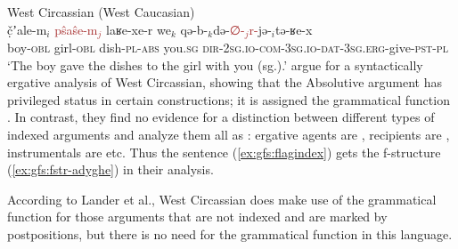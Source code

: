 \documentclass[output=paper]{../langscibook}
\begin{document}
 \ea\label{ex:gfs:flagindex} West Circassian (West Caucasian)\\
\gll \textcolor{lsLightWine}{č̣ʼale-m$_i$} \textcolor{brown}{pŝaŝe-m$_j$} laʁe-xe-r \textcolor{lsMidBlue}{we$_k$} qə-\textcolor{lsMidBlue}{b-$_k$də-}\textcolor{brown}{∅-$_j$r-}\textcolor{lsLightWine}{jə-$_i$}tə-ʁe-x\\
boy-\textsc{obl} girl-\textsc{obl} dish-\textsc{pl}-\textsc{abs} you.\textsc{sg} \textsc{dir-}\textsc{2sg.io-com-}\textsc{3sg.io-dat-}\textsc{3sg.erg-}give\textsc{-pst}\textsc{-pl}\\
\trans `The boy gave the dishes to the girl with you (sg.).' \citep[226]{lander-etal2021}
\z
\citet{lander-etal2021} argue for a syntactically ergative analysis of West Circassian, showing that the Absolutive argument has privileged status in certain constructions; it is assigned the grammatical function \SUBJ. In contrast, they find no evidence for a distinction between different types of indexed arguments and analyze them all as {\OBJTHETA}: ergative agents are {}, recipients are {}, instrumentals are {} etc. Thus the sentence (\ref{ex:gfs:flagindex}) gets the f-structure (\ref{ex:gfs:fstr-adyghe}) in their analysis. 

According to Lander et al., West Circassian does make use of the grammatical function {\OBLTHETA} for those arguments that are not indexed and are marked by postpositions, but there is no need for the grammatical function \OBJ in this language.
 
\end{document}
